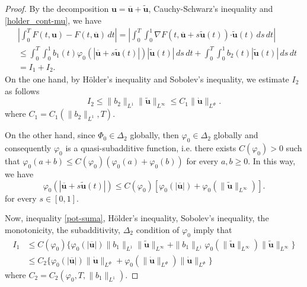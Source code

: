 \documentclass[twoside]{article}
\theoremstyle{remark}
\newcommand{\orlnor}{\|_{L^{\Phi}}}
\renewcommand{\b}[1]{\boldsymbol{#1}}
\newcommand{\ccdot}{\b{\cdot}}
\renewcommand{\leq}{\leqslant}
\renewcommand{\geq}{\geqslant}
\begin{document}
\begin{proof}
By the decomposition $\b{u}=\overline{\b{u}}+\b{\tilde{u}}$,   Cauchy-Schwarz's inequality 
and \eqref{holder_cont-mu}, we have
\begin{equation}\label{cota-diferencia-F}
\begin{split}
&\left|\int_0^T F(t,\b{u})-F(t,\b{\overline{u}})\,dt\right|=
\left|\int_0^T \int_0^1 \nabla F(t,\b{\overline{u}}+s\b{\tilde{u}}(t))\ccdot \b{\tilde{u}}(t) \,ds \,dt\right|
\\
&\leq \int_0^T \int_0^1 b_1(t)\varphi_0(|\b{\overline{u}}+s\b{\tilde{u}}(t)|)|\b{\tilde{u}}(t)|\,ds\,dt+
\int_0^T \int_0^1 b_2(t)|\b{\tilde{u}}(t)|\,ds\,dt
\\
&=I_1+I_2.
\end{split}
\end{equation}
On the one hand, by H\"older's inequality and Sobolev's inequality, we estimate $I_2$ as follows
\begin{equation}\label{cota-i2}
I_2\leq \|b_2\|_{L^1} \|\b{\tilde{u}}\|_{L^{\infty}}\leq
C_1\|\b{\dot u}\orlnor.
\end{equation}
 where $C_1=C_1(\|b_2\|_{L^1}, T)$. 

On the other hand, since $\Phi_0 \in \Delta_2$ globally, then $\varphi_0 \in \Delta_2$ globally and 
consequently $\varphi_0$ is a quasi-subadditive function, i.e. there exists $C(\varphi_0)>0$ such that 
$\varphi_0(a+b)\leq C(\varphi_0)(\varphi_0(a)+\varphi_0(b))$ for every $a,b\geq 0$.
In this way, we have
\begin{equation}\label{pot-suma}
\varphi_0(|\b{\overline{u}}+s\b{\tilde{u}}(t)|)\leq
C(\varphi_0)[\varphi_0(|\b{\overline{u}}|)+\varphi_0(\|\b{\tilde{u}}\|_{L^{\infty}})].
\end{equation}
for every $s \in [0,1]$. 

Now,  inequality \eqref{pot-suma}, H\"older's inequality, Sobolev's inequality,
 the monotonicity, the subadditivity,  $\Delta_2$ condition of $\varphi_0$ imply that
\begin{equation}\label{cota-i1}
\begin{split}
I_1&
\leq C(\varphi_0)\bigg\{ \varphi_0(|\b{\overline{u}}|) \|b_1\|_{L^1} \|\b{\tilde{u}}\|_{L^{\infty}}+
 \|b_1\|_{L^1}\varphi_0(\|\b{\tilde{u}}\|_{L^\infty})\|\b{\tilde{u}}\|_{L^\infty}\bigg\}
\\
&\leq C_2 \bigg\{ \varphi_0(|\b{\overline{u}}|) \|\b{\dot{u}}\orlnor
+\varphi_0(\|\b{\dot u}\orlnor) \|\b{\dot u}\orlnor\bigg\}
\end{split}
\end{equation}
where $C_2=C_2(\varphi_0,T, \|b_1\|_{L^1} )$. 


\end{proof}
\end{document}
